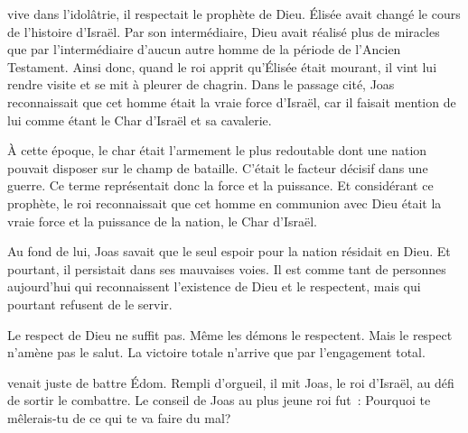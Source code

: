  vive dans l'idolâtrie,
 il respectait le prophète de Dieu.
 Élisée avait changé le cours de l'histoire d'Israël.
 Par son intermédiaire, Dieu avait réalisé plus de miracles
 que par l'intermédiaire d'aucun autre homme de la période
 de l'Ancien Testament.
 Ainsi donc, quand le roi apprit qu'Élisée était mourant,
 il vint lui rendre visite et se mit à pleurer de chagrin.
 Dans le passage cité, Joas reconnaissait que cet homme était
 la vraie force d'Israël, car il faisait mention de lui comme étant
 \og le Char d'Israël et sa cavalerie. \fg{}

À cette époque, le char était l'armement le plus redoutable
 dont une nation pouvait disposer sur le champ de bataille.
 C'était le facteur décisif dans une guerre.
 Ce terme représentait donc la force et la puissance.
 Et considérant ce prophète, le roi reconnaissait que cet homme
 en communion avec Dieu était la vraie force et la puissance
 de la nation, le \og Char d'Israël. \fg{}

Au fond de lui, Joas savait que le seul espoir pour la nation
 résidait en Dieu. Et pourtant, il persistait dans ses mauvaises voies.
 Il est comme tant de personnes aujourd'hui qui reconnaissent
 l'existence de Dieu et le respectent, mais qui pourtant refusent de le servir.


Le respect de Dieu ne suffit pas. Même les démons le respectent.
 Mais le respect n'amène pas le salut.
 La victoire totale n'arrive que par l'engagement total. 

\dvrule






 venait juste de battre Édom.
 Rempli d'orgueil, il mit Joas, le roi d'Israël,
 au défi de sortir le combattre.
 Le conseil de Joas au plus jeune roi fut~:
 \og Pourquoi te mêlerais-tu de ce qui te va faire du mal? \fg{}

